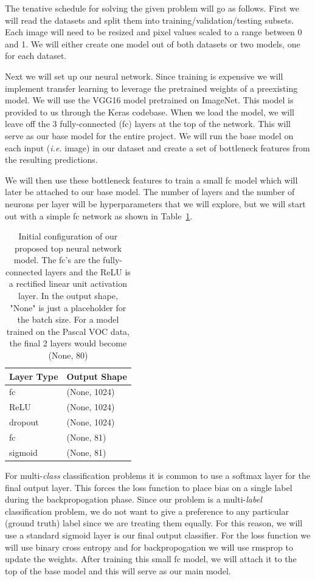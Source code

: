\documentclass[10pt, a4paper, twocolumn]{article} %
\begin{document}
The tenative schedule for solving the given problem will go as follows. First we will read the datasets and split them into training/validation/testing subsets.  Each image will need to be resized and pixel values scaled to a range between 0 and 1. We will either create one model out of both datasets or two models, one for each dataset.

Next we will set up our neural network. Since training is expensive we will implement transfer learning to leverage the pretrained weights of a preexisting model.  We will use the VGG16 model pretrained on ImageNet.  This model is provided to us through the Keras codebase.  When we load the model, we will leave off the 3 fully-connected (fc) layers at the top of the network.  This will serve as our base model for the entire project.  We will run the base model on each input (\textit{i.e.} image) in our dataset and create a set of bottleneck features from the resulting predictions.

We will then use these bottleneck features to train a small fc model which will later be attached to our base model.  The number of layers and the number of neurons per layer will be hyperparameters that we will explore, but we will start out with a simple fc network as shown in Table~\ref{tab:top_model}.
\begin{table}
\centering
\caption{Initial configuration of our proposed top neural network model. The fc's are the fully-connected layers and the ReLU is a rectified linear unit activation layer. In the output shape, "None" is just a placeholder for the batch size.  For a model trained on the  Pascal VOC data, the final 2 layers would become (None, 80)}
\label{tab:top_model}
\begin{tabular}{ll}
\hline
Layer Type & Output Shape \\
\hline
fc      & (None, 1024) \\
ReLU    & (None, 1024) \\
dropout & (None, 1024) \\
fc      & (None, 81)   \\
sigmoid & (None, 81)   \\
\hline
\end{tabular}
\end{table}
For multi-\textit{class} classification problems it is common to use a softmax layer for the final output layer. This forces the loss function to place bias on a single label during the backpropogation phase.  Since our problem is a multi-\textit{label} classification problem, we do not want to give a preference to any particular (ground truth) label since we are treating them equally.  For this reason, we will use a standard sigmoid layer is our final output classifier.  For the loss function we will use binary cross entropy and for backpropogation we will use rmsprop to update the weights.  After training this small fc model, we will attach it to the top of the base model and this will serve as our main model. 
\end{document}
